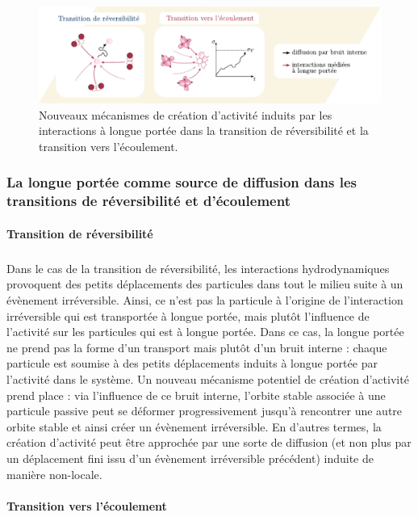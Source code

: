 \begin{figure}[h]
	\centering
	\includegraphics[width=\textwidth]{Chapitre1/Figures/Pb/bruit.pdf}
	\caption{Nouveaux mécanismes de création d'activité induits par les interactions à longue portée dans la transition de réversibilité et la transition vers l'écoulement.}
	\label{fig:bruit}
\end{figure}

\subsubsection{La longue portée comme source de diffusion dans les transitions de réversibilité et d'écoulement}

\paragraph{Transition de réversibilité}

\subparagraph{}Dans le cas de la transition de réversibilité, les interactions hydrodynamiques provoquent des petits déplacements des particules dans tout le milieu suite à un évènement irréversible. Ainsi, ce n'est pas la particule à l'origine de l'interaction irréversible qui est transportée à longue portée, mais plutôt l'influence de l'activité sur les particules qui est à longue portée. Dans ce cas, la longue portée ne prend pas la forme d'un transport mais plutôt d'un bruit interne : chaque particule est soumise à des petits déplacements induits à longue portée par l'activité dans le système. Un nouveau mécanisme potentiel de création d'activité prend place : via l'influence de ce bruit interne, l'orbite stable associée à une particule passive peut se déformer progressivement jusqu'à rencontrer une autre orbite stable et ainsi créer un évènement irréversible. En d'autres termes, la création d'activité peut être approchée par une sorte de diffusion (et non plus par un déplacement fini issu d'un évènement irréversible précédent) induite de manière non-locale.

\paragraph{Transition vers l'écoulement}

